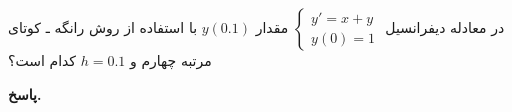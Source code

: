 در معادله دیفرانسیل 
\(\begin{cases}
	y' = x + y\\
	y(0) = 1
\end{cases}\)
مقدار
\(y(0.1)\)
با استفاده از روش رانگه ـ کوتای مرتبه چهارم
و
\(h=0.1\)
کدام است؟
\vspace*{-.3cm}

\begin{answer}

	\textbf{پاسخ.}
	
\end{answer}
